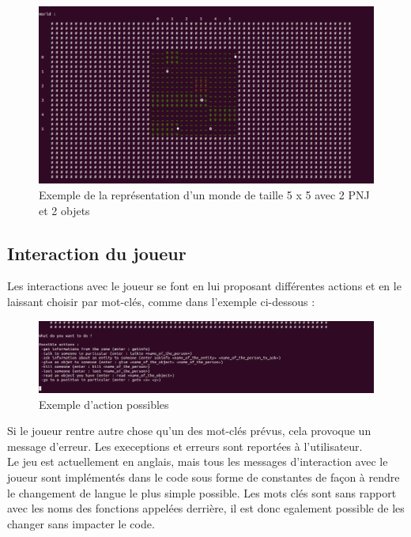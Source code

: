 \documentclass[asi]{picINSA}
\begin{document}
\begin{figure}[!ht]
  \begin{center}
    \includegraphics[width=1\textwidth]{images/screenshootWorld01.png}
    \caption{Exemple de la représentation d'un monde de taille 5 x 5 avec 2 PNJ et 2 objets}	
  \end{center}
\end{figure}

\subsection{Interaction du joueur}
Les interactions avec le joueur se font en lui proposant différentes actions et en le laissant choisir par mot-clés, comme dans l'exemple ci-dessous : \\
\begin{figure}[!ht]
  \begin{center}
    \includegraphics[width=1\textwidth]{images/screenshootUI01.png}
    \caption{Exemple d'action possibles}	
  \end{center}
\end{figure}

Si le joueur rentre autre chose qu'un des mot-clés prévus, cela provoque un message d'erreur. Les  execeptions et erreurs sont reportées à l'utilisateur. \\

Le jeu est actuellement en anglais, mais tous les messages d'interaction avec le joueur sont implémentés dans le code sous forme de constantes de façon à rendre le changement de langue le plus simple possible. Les mots clés sont sans rapport avec les noms des fonctions appelées derrière, il est donc egalement possible de les changer sans impacter le code.


  
\end{document}
